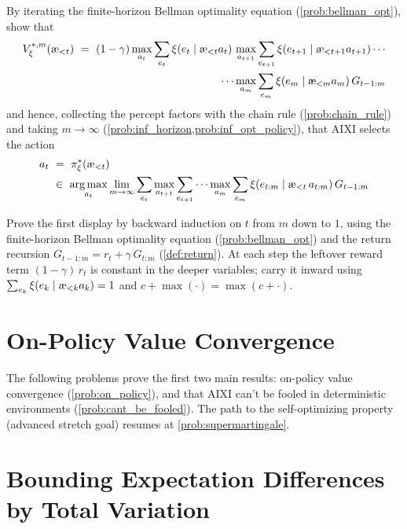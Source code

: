 \documentclass[fontsize=11pt, parskip=half]{scrartcl}
\DeclareMathOperator*{\argmax}{arg\,max}
\newcommand{\aes}{\textnormal{\ae}}
\begin{document}
\begin{exercise}
\label{prob:expectimax_derivation}
By iterating the finite-horizon Bellman optimality equation (\cref{prob:bellman_opt}), show that
\begin{align*}
    V_\xi^{*,m}(\aes_{<t})
    ~=~ (1-\gamma) \max_{a_t} \sum_{e_t} \xi(e_t \mid \aes_{<t} a_t)\, &\max_{a_{t+1}} \sum_{e_{t+1}} \xi(e_{t+1} \mid \aes_{<t+1} a_{t+1}) \cdots \\
    \cdots &\max_{a_m} \sum_{e_m} \xi(e_m \mid \aes_{<m} a_m) \,G_{t-1:m}
\end{align*}
and hence, collecting the percept factors with the chain rule (\cref{prob:chain_rule}) and taking $m \to \infty$ (\cref{prob:inf_horizon,prob:inf_opt_policy}), that AIXI selects the action
\begin{align*}
    a_t &~=~ \pi_\xi^*(\aes_{<t}) \\
    &~\in~ \argmax_{a_t} \lim_{m\to\infty} \sum_{e_t} \max_{a_{t+1}} \sum_{e_{t+1}} \cdots \max_{a_m} \sum_{e_m}
    \xi(e_{t:m} \mid \aes_{<t}\, a_{t:m}) \,G_{t-1:m}
\end{align*}


\begin{hint}
Prove the first display by backward induction on $t$ from $m$ down to $1$, using the finite-horizon Bellman optimality equation (\cref{prob:bellman_opt}) and the return recursion $G_{t-1:m} = r_t + \gamma\, G_{t:m}$ (\cref{def:return}). At each step the leftover reward term $(1-\gamma)\, r_t$ is constant in the deeper variables; carry it inward using $\sum_{e_k} \xi(e_k \mid \aes_{<k} a_k) = 1$ and $c + \max(\cdot) = \max(c + \cdot)$.
\end{hint}
\end{exercise}



\section*{On-Policy Value Convergence}

The following problems prove the first two main results: on-policy value convergence (\cref{prob:on_policy}), and that AIXI can't be fooled in deterministic environments (\cref{prob:cant_be_fooled}).
The path to the self-optimizing property (advanced stretch goal) resumes at \cref{prob:supermartingale}.

\section{Bounding Expectation Differences by Total Variation}\label{prob:tv_bound}
\end{document}
